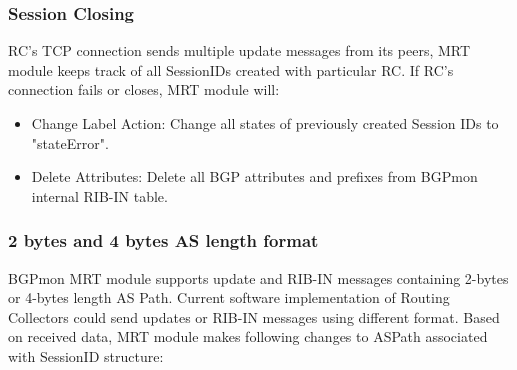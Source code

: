 \subsubsection{Session Closing}
\label{sec:mrt:sessionclosing}
RC's TCP connection sends multiple update messages from its peers, MRT module keeps track of all SessionIDs created with particular RC. If RC's connection fails or closes, MRT module will:
\begin{itemize}
\item{{Change Label Action:} Change all states of previously created Session IDs to "stateError". }
\item{{Delete Attributes:} Delete all BGP attributes and prefixes from BGPmon internal RIB-IN table. }
\end{itemize}

\subsubsection{2 bytes and 4 bytes AS length format}
BGPmon MRT module supports update and RIB-IN messages containing 2-bytes or 4-bytes length AS Path. Current software implementation of Routing Collectors could send updates or RIB-IN messages using different format. Based on received data, MRT module makes following changes to ASPath associated with SessionID structure:
